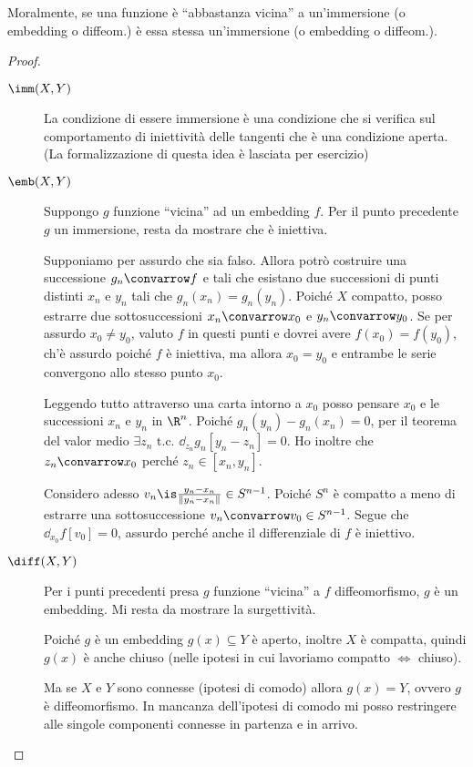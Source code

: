 Moralmente, se una funzione è ``abbastanza vicina'' a un'immersione (o embedding o diffeom.) è essa stessa un'immersione (o embedding o diffeom.).
\begin{proof}
\noindent
\begin{description}
\item [$\imm(X,Y)$] La condizione di essere immersione è una condizione che si verifica sul comportamento di iniettività delle tangenti che è una condizione aperta. (La formalizzazione di questa idea è lasciata per esercizio)
\item [$\emb(X,Y)$] Suppongo $g$ funzione ``vicina'' ad un embedding $f$. Per il punto precedente $g$ un immersione, resta da mostrare che è iniettiva. 

Supponiamo per assurdo che sia falso. Allora potrò costruire una successione $g_n \convarrow f$ e tali che esistano due successioni di punti distinti $x_n$ e $y_n$ tali che $g_n(x_n) = g_n(y_n)$. 
Poiché $X$ compatto, posso estrarre due sottosuccessioni $x_n \convarrow x_0$ e $y_n \convarrow y_0$. Se per assurdo $x_0 \neq y_0$, valuto $f$ in questi punti e dovrei avere $f(x_0)=f(y_0)$, ch'è assurdo poiché $f$ è iniettiva, ma allora $x_0=y_0$ e entrambe le serie convergono allo stesso punto $x_0$.

Leggendo tutto attraverso una carta intorno a $x_0$ posso pensare $x_0$ e le successioni $x_n$ e $y_n$ in $\R^n$.
Poiché $g_n(y_n)-g_n(x_n)=0$, per il teorema del valor medio $\exists z_n \text{ t.c. } \dd_{z_n}g_n[y_n-z_n]=0$.
Ho inoltre che $z_n \convarrow x_0$ perché $z_n \in [x_n,y_n]$.

Considero adesso $v_n \is \frac{y_n-x_n}{\left \|y_n - x_n \right \|} \in S^{n-1}$. Poiché $S^n$ è compatto a meno di estrarre una sottosuccessione $v_n \convarrow v_0 \in S^{n-1}$.
Segue che $\dd_{x_0}f[v_0]=0$,
assurdo perché anche il differenziale di $f$ è iniettivo. \absurd
\item [$\diff(X,Y)$] Per i punti precedenti presa $g$ funzione ``vicina'' a $f$ diffeomorfismo, $g$ è un embedding. Mi resta da mostrare la surgettività.

Poiché $g$ è un embedding $g(x) \subseteq Y$ è aperto, inoltre $X$ è compatta, quindi $g(x)$ è anche chiuso (nelle ipotesi in cui lavoriamo compatto $\iff$ chiuso).

Ma se $X$ e $Y$ sono connesse (ipotesi di comodo) allora $g(x) = Y$, ovvero $g$ è diffeomorfismo. In mancanza dell'ipotesi di comodo mi posso restringere alle singole componenti connesse in partenza e in arrivo.
\qedhere
\end{description}
\end{proof}

